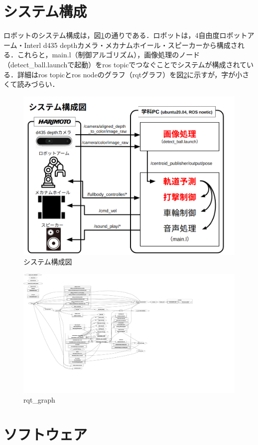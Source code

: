 \documentclass[11pt, oneside, titlepage]{jarticle}
\begin{document}
\section{システム構成}
ロボットのシステム構成は，図\ref{system}の通りである．ロボットは，4自由度ロボットアーム・Interl d435 depthカメラ・メカナムホイール・スピーカーから構成される．これらと，main.l（制御アルゴリズム），画像処理のノード（detect\_ball.launchで起動）をros topicでつなぐことでシステムが構成されている．詳細はros topicとros nodeのグラフ（rqtグラフ）を図\ref{rqt}に示すが，字が小さくて読みづらい．
\begin{figure}[H]
\centering
\includegraphics[width=12cm]{figures/system.png}
\caption{システム構成図}
\label{system}
\end{figure}
\begin{figure}[H]
\centering
\includegraphics[width=15cm]{figures/rosgraph.png}
\caption{rqt\_graph}
\label{rqt}
\end{figure}
\section{ソフトウェア}
\end{document}
